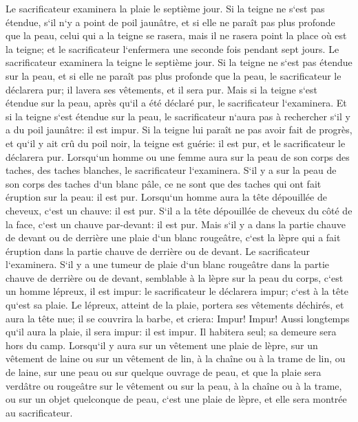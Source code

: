 \verse Le sacrificateur examinera la plaie le septième jour. Si la teigne ne s`est pas étendue, s`il n`y a point de poil jaunâtre, et si elle ne paraît pas plus profonde que la peau, 
\verse celui qui a la teigne se rasera, mais il ne rasera point la place où est la teigne; et le sacrificateur l`enfermera une seconde fois pendant sept jours. 
\verse Le sacrificateur examinera la teigne le septième jour. Si la teigne ne s`est pas étendue sur la peau, et si elle ne paraît pas plus profonde que la peau, le sacrificateur le déclarera pur; il lavera ses vêtements, et il sera pur. 
\verse Mais si la teigne s`est étendue sur la peau, après qu`il a été déclaré pur, le sacrificateur l`examinera. 
\verse Et si la teigne s`est étendue sur la peau, le sacrificateur n`aura pas à rechercher s`il y a du poil jaunâtre: il est impur. 
\verse Si la teigne lui paraît ne pas avoir fait de progrès, et qu`il y ait crû du poil noir, la teigne est guérie: il est pur, et le sacrificateur le déclarera pur. 
\verse Lorsqu`un homme ou une femme aura sur la peau de son corps des taches, des taches blanches, 
\verse le sacrificateur l`examinera. S`il y a sur la peau de son corps des taches d`un blanc pâle, ce ne sont que des taches qui ont fait éruption sur la peau: il est pur. 
\verse Lorsqu`un homme aura la tête dépouillée de cheveux, c`est un chauve: il est pur. 
\verse S`il a la tête dépouillée de cheveux du côté de la face, c`est un chauve par-devant: il est pur. 
\verse Mais s`il y a dans la partie chauve de devant ou de derrière une plaie d`un blanc rougeâtre, c`est la lèpre qui a fait éruption dans la partie chauve de derrière ou de devant. 
\verse Le sacrificateur l`examinera. S`il y a une tumeur de plaie d`un blanc rougeâtre dans la partie chauve de derrière ou de devant, semblable à la lèpre sur la peau du corps, 
\verse c`est un homme lépreux, il est impur: le sacrificateur le déclarera impur; c`est à la tête qu`est sa plaie. 
\verse Le lépreux, atteint de la plaie, portera ses vêtements déchirés, et aura la tête nue; il se couvrira la barbe, et criera: Impur! Impur! 
\verse Aussi longtemps qu`il aura la plaie, il sera impur: il est impur. Il habitera seul; sa demeure sera hors du camp. 
\verse Lorsqu`il y aura sur un vêtement une plaie de lèpre, sur un vêtement de laine ou sur un vêtement de lin, 
\verse à la chaîne ou à la trame de lin, ou de laine, sur une peau ou sur quelque ouvrage de peau, 
\verse et que la plaie sera verdâtre ou rougeâtre sur le vêtement ou sur la peau, à la chaîne ou à la trame, ou sur un objet quelconque de peau, c`est une plaie de lèpre, et elle sera montrée au sacrificateur. 
